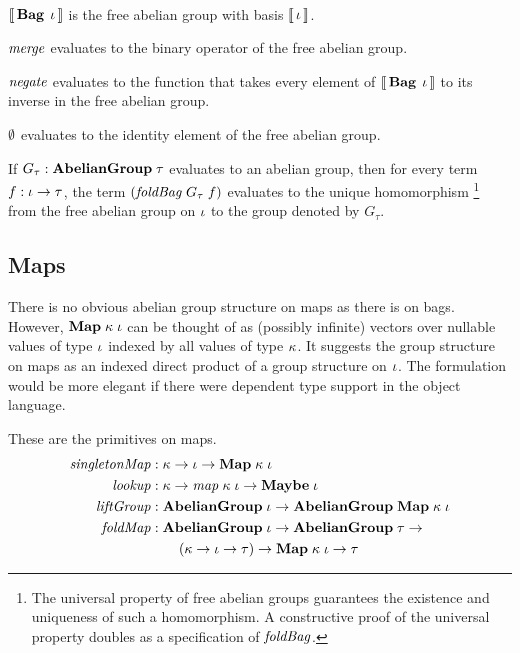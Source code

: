 \begin{oldSec}
\begin{definition}~
\begin{subdefinition}
\item $\Eval{\Bag[\Gi]}$ is the free abelian group with basis $\Eval\Gi$.
\item $\mathit{merge}$ evaluates to the binary operator of the free abelian
group.
\item $\mathit{negate}$ evaluates to the function that takes every
element of $\Eval{\Bag[\Gi]}$ to its inverse in the free abelian
group.
\item $\Empty$ evaluates to the identity element of the free
abelian group.
\item\label{foldBag-homomorphism} If
$\HasType{G_\tau}{\Abelian\tau}$ evaluates to an abelian group,
then for every term $\HasType f {\Fun\Gi\Gt}$, the term
$\App*{\App\FOLDBAG{G_\tau}}{f}$ evaluates to the unique
homomorphism%
\footnote{ The universal property of free abelian groups
guarantees the existence and uniqueness of such a homomorphism. A
constructive proof of the universal property doubles as a
specification of $\mathit{foldBag}$. } %
from the free abelian group on $\iota$ to the group denoted by
$G_\tau$.
\end{subdefinition}
\end{definition}

\subsection{Maps}

There is no obvious abelian group structure on maps as there is
on bags. However, $\HashMap\Gk\Gi$ can be thought of as (possibly
infinite) vectors over nullable values of type $\iota$ indexed by
all values of type $\kappa$. It suggests the group structure on maps
as an indexed direct product of a group structure on $\iota$. The
formulation would be more elegant if there were dependent type
support in the object language.

These are the primitives on maps.
\begin{align*}
\HasTypeAligned\MAKEMAP
  {\Fun\Gk{\Fun\Gi{\HashMap\Gk\Gi}}}
\\
\HasTypeAligned\LOOKUP
  {\Fun\Gk{\Fun{\MapT\Gk\Gi}{\Maybe\Gi}}}
\\
\HasTypeAligned\LIFTGROUP
  \Fun{\Abelian\Gi}{\Abelian{\HashMap\Gk\Gi}}
\\
\HasTypeAligned\FOLDMAP
  \Fun{\Abelian\Gi}
    {\Fun{\Abelian\Gt} \\ & \qquad
      {\Fun{ \Fun*\Gk{\Fun\Gi\Gt} }
        {\Fun{\HashMap\Gk\Gi} \Gt}}}
\end{align*}


\end{oldSec}
